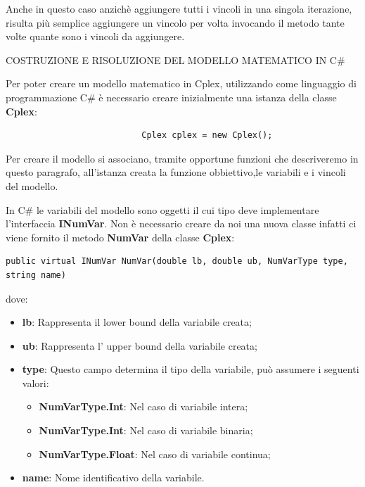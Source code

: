 \documentclass[11pt]{article}
\begin{document}
Anche in questo caso anzich\`e aggiungere tutti i vincoli in una singola iterazione, risulta pi\`u semplice aggiungere un vincolo per volta invocando il metodo tante volte quante sono i vincoli da aggiungere.

\vspace{2\baselineskip}
COSTRUZIONE E RISOLUZIONE DEL MODELLO MATEMATICO IN C\#
\vspace{2\baselineskip}

Per poter creare un modello matematico in Cplex, utilizzando come linguaggio di programmazione C\# \`e necessario creare inizialmente una istanza della classe \textbf{Cplex}:

\begin{lstlisting}
                           Cplex cplex = new Cplex();
\end{lstlisting}

Per creare il modello si associano, tramite opportune funzioni che descriveremo in questo paragrafo, all'istanza creata la funzione obbiettivo,le variabili e i vincoli del modello. 

In C\# le variabili del modello sono oggetti il cui tipo deve implementare l'interfaccia \textbf{INumVar}. Non è necessario creare da noi una nuova classe infatti ci viene fornito il metodo \textbf{NumVar} della classe \textbf{Cplex}:

\begin{lstlisting}
public virtual INumVar NumVar(double lb, double ub, NumVarType type, string name)
\end{lstlisting}

dove:

\begin{itemize}
\item \textbf{lb}: Rappresenta il lower bound della variabile creata;
\item \textbf{ub}: Rappresenta l' upper bound della variabile creata;
\item \textbf{type}: Questo campo determina il tipo della variabile, pu\`o assumere i seguenti valori:
\begin{itemize}
\item \textbf{NumVarType.Int}: Nel caso di variabile intera;
\item \textbf{NumVarType.Int}: Nel caso di variabile binaria;
\item \textbf{NumVarType.Float}: Nel caso di variabile continua;
\end{itemize}
\item \textbf{name}: Nome identificativo della variabile.
\end{itemize}
\end{document}

